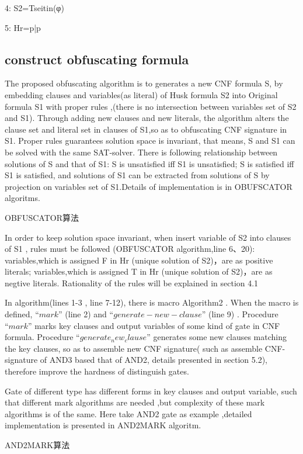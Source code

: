 \documentclass[runningheads,a4paper]{llncs}
\begin{document}
4: S2=Tseitin(φ)

5: Hr=p|p

\subsection{construct obfuscating formula}

The proposed obfuscating algorithm is to generates a new CNF formula S, by embedding clauses and variables(as literal) of Husk formula S2 into Original formula S1 with proper rules ,(there is no intersection between variables set of S2 and S1). Through adding new clauses and new literals, the algorithm alters the clause set and literal set in clauses of S1,so as to obfuscating CNF signature in S1. Proper rules guarantees solution space is invariant, that means, S and S1 can be solved with the same SAT-solver. There is following relationship between solutions of S and that of S1: S is unsatisfied iff S1 is unsatisfied; S is satisfied iff S1 is satisfied, and solutions of S1 can be extracted from solutions of S by projection on variables set of S1.Details of implementation is in OBUFSCATOR algoritms.

OBFUSCATOR算法

In order to keep solution space invariant, when insert variable of S2 into clauses of S1 , rules must be followed (OBFUSCATOR algorithm,line 6、20): variables,which is assigned F in Hr (unique solution of S2)，are as positive literals; variables,which is assigned T in Hr (unique solution of S2)，are as negtive literals. Rationality of the rules will be explained in section 4.1

In algorithm(lines 1-3 , line 7-12), there is macro Algorithm2 . When the macro is defined, $“mark”$ (line 2) and $“generate-new-clause”$ (line 9) . Procedure $“mark”$ marks key clauses and output variables of some kind of gate in CNF formula. Procedure $“generate_new_clause”$ generates some new clauses matching the key clauses, so as to  assemble new CNF signature( such as assemble CNF-signature of AND3 based that of AND2, details presented in section 5.2), therefore improve the hardness of distinguish gates.

Gate of different type has different forms in key clauses and output variable, such that different mark algorithms are needed ,but complexity of these mark algorithms is of the same. Here take AND2 gate as example ,detailed implementation is presented in AND2MARK algoritm.  

\noindent AND2MARK算法
\end{document}
